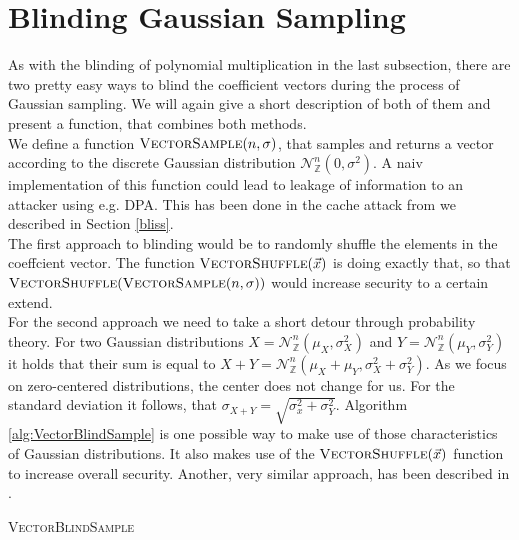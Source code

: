 \section{Blinding Gaussian Sampling}
As with the blinding of polynomial multiplication in the last subsection, there are two pretty easy ways to blind the coefficient vectors during the process of Gaussian sampling. We will again give a short description of both of them and present a function, that combines both methods.\\
We define a function \(\textsc{VectorSample}(n,\sigma)\), that samples and returns a vector according to the discrete Gaussian distribution \(\mathcal{N}_\mathbb{Z}^{n} (0, \sigma^2)\). A naiv implementation of this function could lead to leakage of information to an attacker using e.g. DPA. This has been done in the cache attack from \cite{cryptoeprint:2016:300} we described in Section \ref{bliss}.\\
The first approach to blinding would be to randomly shuffle the elements in the coeffcient vector. The function \(\textsc{VectorShuffle}(\vec{x})\) is doing exactly that, so that \(\textsc{VectorShuffle}(\textsc{VectorSample}(n,\sigma))\) would increase security to a certain extend.\\
For the second approach we need to take a short detour through probability theory. For two Gaussian distributions \(X=\mathcal{N}_\mathbb{Z}^{n} (\mu_X, \sigma^2_X)\) and \(Y=\mathcal{N}_\mathbb{Z}^{n} (\mu_Y, \sigma^2_Y)\) it holds that their sum is equal to \(X+Y=\mathcal{N}_\mathbb{Z}^{n} (\mu_X+\mu_Y, \sigma^2_X+\sigma^2_Y)\). As we focus on zero-centered distributions, the center does not change for us. For the standard deviation it follows, that \(\sigma_{X+Y}=\sqrt{\sigma^2_x+\sigma^2_Y}\). Algorithm \ref{alg:VectorBlindSample} is one possible way to make use of those characteristics of Gaussian distributions. It also makes use of the \(\textsc{VectorShuffle}(\vec{x})\) function to increase overall security. Another, very similar approach, has been described in \cite{cryptoeprint:2014:254}.


\begin{algorithm}
    \caption{\textsc{VectorBlindSample}}
    \label{alg:VectorBlindSample}
    \begin{algorithmic}[1]
        \EndFor\\
    \end{algorithmic}
\end{algorithm}